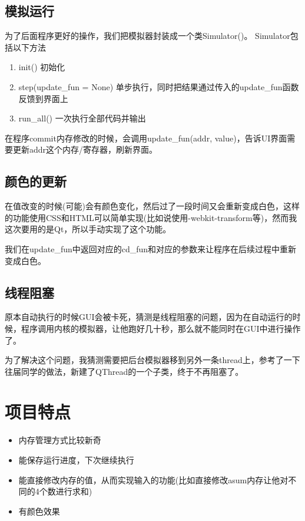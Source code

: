 \documentclass{article}
\begin{document}
\subsection{模拟运行}
为了后面程序更好的操作，我们把模拟器封装成一个类Simulator()。
Simulator包括以下方法
\begin{enumerate}
\item init() 初始化
\item step(update\_fun = None) 单步执行，同时把结果通过传入的update\_fun函数反馈到界面上
\item run\_all() 一次执行全部代码并输出
\end{enumerate}

在程序commit内存修改的时候，会调用update\_fun(addr, value)，告诉UI界面需要更新addr这个内存/寄存器，刷新界面。

\subsection{颜色的更新}
在值改变的时候(可能)会有颜色变化，然后过了一段时间又会重新变成白色，这样的功能使用CSS和HTML可以简单实现(比如说使用-webkit-transform等)，然而我这次要用的是Qt，所以手动实现了这个功能。

我们在update\_fun中返回对应的cd\_fun和对应的参数来让程序在后续过程中重新变成白色。

\subsection{线程阻塞}
原本自动执行的时候GUI会被卡死，猜测是线程阻塞的问题，因为在自动运行的时候，程序调用内核的模拟器，让他跑好几十秒，那么就不能同时在GUI中进行操作了。

为了解决这个问题，我猜测需要把后台模拟器移到另外一条thread上，参考了一下往届同学的做法\cite{4}，新建了QThread的一个子类，终于不再阻塞了。

\section{项目特点}
\begin{itemize}
\item 内存管理方式比较新奇
\item 能保存运行进度，下次继续执行
\item 能直接修改内存的值，从而实现输入的功能(比如直接修改asum内存让他对不同的4个数进行求和)
\item 有颜色效果
\end{itemize}
\end{document}
